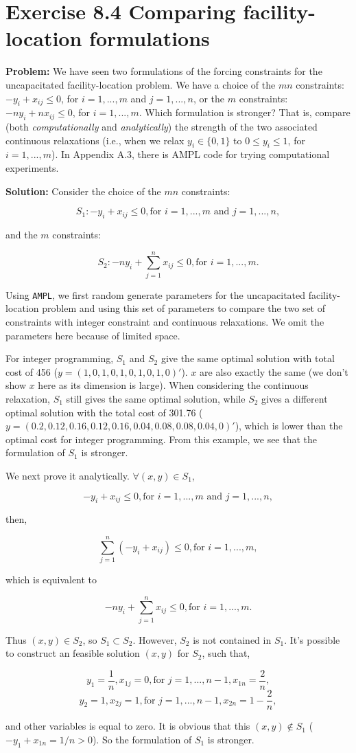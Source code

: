 \section{Exercise 8.4 Comparing facility-location formulations}
\textbf{Problem:} We have seen two formulations of the forcing constraints for the uncapacitated facility-location problem. We have a choice of the $mn$ constraints: $−y_{i} + x_{ij} \leq 0$, for $i=1, ..., m$ and $j=1,..., n$, or the $m$ constraints: $−ny_{i}+nx_{ij} \leq 0$, for $i=1,...,m$. Which formulation is stronger? That is, compare (both \textit{computationally} and \textit{analytically}) the strength of the two associated continuous relaxations (i.e., when we relax $y_{i}\in{}\lbrace0,1\rbrace$ to $0\leq{}y_{i}\leq1$, for $i=1,...,m$).  In Appendix A.3, there is AMPL code for trying computational experiments.

\textbf{Solution:} Consider the choice of the $mn$ constraints:

$$S_1: -y_i+x_{ij}\leq0, \text{for } i=1,...,m \text{ and } j = 1,...,n,$$

and the $m$ constraints:

$$S_2: -ny_i+\sum_{j=1}^n x_{ij}\leq0, \text{for } i=1,...,m.$$

Using {\tt AMPL}, we first random generate parameters for the uncapacitated facility-location problem and using this set of parameters to compare the two set of constraints with integer constraint and continuous relaxations. We omit the parameters here because of limited space. 

For integer programming, $S_1$ and $S_2$ give the same optimal solution with total cost of 456 ($y = (1,0,1,0,1,0,1,0,1,0)'$). $x$ are also exactly the same (we don't show $x$ here as its dimension is large). When considering the continuous relaxation, $S_1$ still gives the same optimal solution, while $S_2$ gives a different optimal solution with the total cost of 301.76 ($y = (0.2,0.12,0.16,0.12,0.16,0.04,0.08,0.08,0.04,0)'$), which is lower than the optimal cost for integer programming. From this example, we see that the formulation of $S_1$ is stronger.

We next prove it analytically. $\forall (x,y) \in S_1 $,

$$ -y_i+x_{ij}\leq0, \text{for } i=1,...,m \text{ and } j = 1,...,n,$$

then,

$$\sum_{j=1}^n (-y_i+x_{ij})\leq0, \text{for } i=1,...,m, $$

which is equivalent to

$$-ny_i+\sum_{j=1}^n x_{ij}\leq0, \text{for } i=1,...,m.$$

Thus $ (x,y) \in S_2 $, so $S_1 \subset S_2$. However, $S_2$ is not contained in $S_1$. It's possible to construct an feasible solution $(x,y)$ for $S_2$, such that,

$$y_1 = \frac{1}{n}, x_{1j}=0, \text{for } j = 1,...,n-1, x_{1n} = \frac{2}{n},$$
$$y_2 = 1, x_{2j}=1, \text{for } j = 1,...,n-1, x_{2n} = 1-\frac{2}{n}, $$

and other variables is equal to zero. It is obvious that this $(x,y) \notin S_1$ ($-y_1+ x_{1n} =1/n > 0$). So the formulation of $S_1$ is stronger.